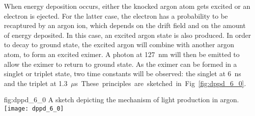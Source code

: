 When energy deposition occurs, either the knocked argon atom gets excited or an electron is ejected. For the latter case, the electron has a probability to be recaptured by an argon ion, which depends on the drift field and on the amount of energy deposited. In this case, an excited argon state is also produced. In order to decay to ground state, the excited argon will combine with another argon atom, to form an excited eximer. A photon at \SI{127}{nm} will then be emitted to allow the eximer to return to ground state. As the eximer can be formed in a singlet or triplet state, two time constants will be observed: the singlet at \SI{6}{ns}
and the triplet at \SI{1.3}{$\mu$s}. These principles are sketched in Fig.~\ref{fig:dppd_6_0}.

\begin{dunefigure}{fig:dppd_6_0}
{A sketch depicting the mechanism of light production in argon.}
\texttt{[image: dppd\_6\_0]}
\end{dunefigure}

